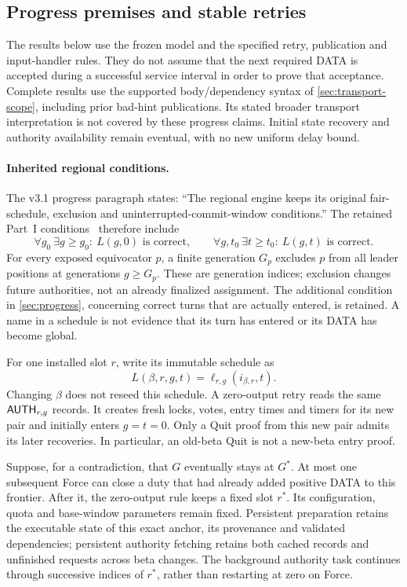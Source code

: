\subsection{Progress premises and stable retries}
\label{sec:v35-progress-premises}
The results below use the frozen model and the specified retry,
publication and input-handler rules. They do not assume that the next
required DATA is accepted during a successful service interval in
order to prove that acceptance. Complete results use the supported
body/dependency syntax of \cref{sec:transport-scope}, including prior
bad-hint publications. Its stated broader transport interpretation is
not covered by these progress claims. Initial state recovery and authority
availability remain eventual, with no new uniform delay bound.

\paragraph{Inherited regional conditions.}
The v3.1 progress paragraph states: ``The regional engine keeps its
original fair-schedule, exclusion and uninterrupted-commit-window
conditions.'' The retained Part~I conditions~\cite{part1} therefore
include
\[
 \forall g_0\ \exists g\ge g_0:\ L(g,0)\text{ is correct},\qquad
 \forall g,t_0\ \exists t\ge t_0:\ L(g,t)\text{ is correct}.
\]
For every exposed equivocator $p$, a finite generation $G_p$ excludes
$p$ from all leader positions at generations $g\ge G_p$. These are
generation indices; exclusion changes future authorities, not an
already finalized assignment. The additional condition in
\cref{sec:progress}, concerning correct turns that are actually entered,
is retained. A name in a schedule is not evidence that its turn has
entered or its DATA has become global.

For one installed slot $r$, write its immutable schedule as
\[
 L(\beta,r,g,t)=\ell_{r,g}(i_{\beta,r},t).
\]
Changing $\beta$ does not reseed this schedule. A zero-output retry reads
the same $\mathsf{AUTH}_{r,g}$ records. It creates fresh locks, votes,
entry times and timers for its new pair and initially enters $g=t=0$.
Only a Quit proof from this new pair admits its later recoveries.
In particular, an old-beta Quit is not a new-beta entry proof.

Suppose, for a contradiction, that $G$ eventually stays at $G^*$.
At most one subsequent Force can close a duty that had already added
positive DATA to this frontier. After it, the zero-output rule keeps a
fixed slot $r^*$. Its configuration, quota and base-window parameters
remain fixed. Persistent preparation retains the executable state of
this exact anchor, its provenance and validated dependencies; persistent
authority fetching retains both cached records and unfinished requests
across beta changes. The background authority task continues through
successive indices of $r^*$, rather than restarting at zero on Force.

